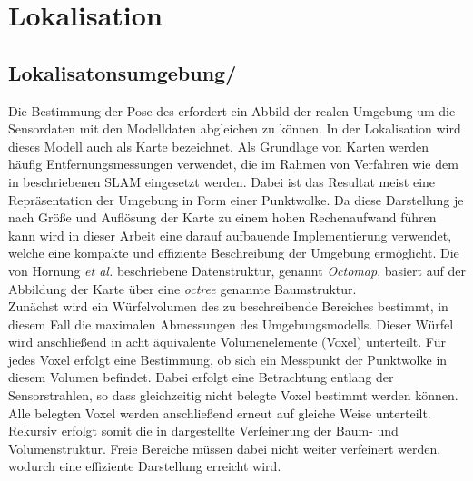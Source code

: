 \chapter{Lokalisation}
\label{chap.loc}

\section{Lokalisatonsumgebung/\red[Karte]}
\label{chap.map}
Die Bestimmung der Pose des  erfordert ein Abbild der realen Umgebung um die Sensordaten mit den Modelldaten abgleichen zu können. In der Lokalisation wird dieses Modell auch als Karte bezeichnet. Als Grundlage von Karten werden häufig Entfernungsmessungen verwendet, die im Rahmen von Verfahren wie dem in  beschriebenen SLAM eingesetzt werden. Dabei ist das Resultat meist eine Repräsentation der Umgebung in Form einer Punktwolke. Da diese Darstellung je nach Größe und Auflösung der Karte zu einem hohen Rechenaufwand führen kann wird in dieser Arbeit eine darauf aufbauende Implementierung \cite{Octomap} verwendet, welche eine kompakte und effiziente Beschreibung der Umgebung ermöglicht. Die von Hornung \textit{et al.} \cite{Hornung2013} beschriebene Datenstruktur, genannt \textit{Octomap}, basiert auf der Abbildung der Karte über eine \textit{octree} genannte Baumstruktur.\\
Zunächst wird ein Würfelvolumen des zu beschreibende Bereiches bestimmt, in diesem Fall die maximalen Abmessungen des Umgebungsmodells. Dieser Würfel wird anschließend in acht äquivalente Volumenelemente (Voxel) unterteilt. Für jedes Voxel erfolgt eine Bestimmung, ob sich ein Messpunkt der Punktwolke in diesem Volumen befindet. Dabei erfolgt eine Betrachtung entlang der Sensorstrahlen, so dass gleichzeitig nicht belegte Voxel bestimmt werden können. Alle belegten Voxel werden anschließend erneut auf gleiche Weise unterteilt. Rekursiv erfolgt somit die in  dargestellte Verfeinerung der Baum- und Volumenstruktur. Freie Bereiche müssen dabei nicht weiter verfeinert werden, wodurch eine effiziente Darstellung erreicht wird.\\

